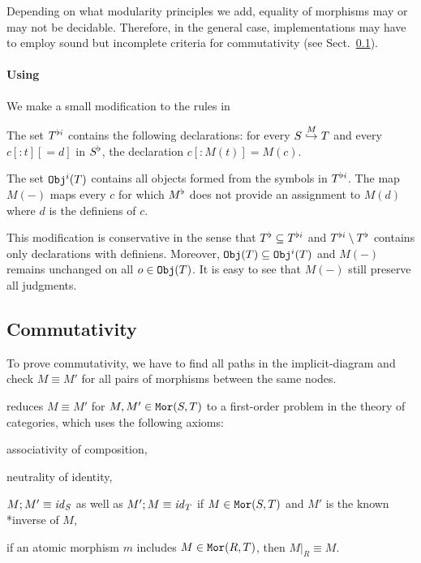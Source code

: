 Depending on what modularity principles we add, equality of morphisms may or may not be decidable.
Therefore, in the general case, implementations may have to employ sound but incomplete criteria for commutativity (see Sect.~\ref{sec:commute}).

%

\paragraph{Using}
We make a small modification to the rules in 

\begin{definition}
The set $\flti{T}$ contains the following declarations:
for every $\ipc{M}{S}{T}$ and every $c[:t][=d]$ in $\flt{S}$, the declaration $c[:M(t)]=M(c)$.

The set $\Expi{T}$ contains all objects formed from the symbols in $\flti{T}$.
The map $M(-)$ maps every $c$ for which $\flt{M}$ does not provide an assignment to $M(d)$ where $d$ is the definiens of $c$.
\end{definition}

This modification is conservative in the sense that $\flt{T}\sq\flti{T}$ and $\flti{T}\sm\flt{T}$ contains only declarations with definiens.
Moreover, $\Exp{T}\sq\Expi{T}$ and $M(-)$ remains unchanged on all $o\in\Exp{T}$.
It is easy to see that $M(-)$ still preserve all judgments.

\subsection{Commutativity}\label{sec:commute}

To prove commutativity, we have to find all paths in the implicit-diagram and check $M\equiv M'$ for all pairs of morphisms between the same nodes.

\mmt reduces $M\equiv M'$ for $M,M'\in\Mo{S}{T}$ to a first-order problem in the theory of categories, which uses the following axioms:
\begin{compactitem}
\item associativity of composition,
\item neutrality of identity,
\item $M;M'\equiv \id{S}$ as well as $M';M\equiv\id{T}$ if $M\in\Mo{S}{T}$ and $M'$ is the known *inverse of $M$,
\item if an atomic morphism $m$ includes $M\in\Mo{R}{T}$, then $M|_R\equiv M$.
\end{compactitem}


